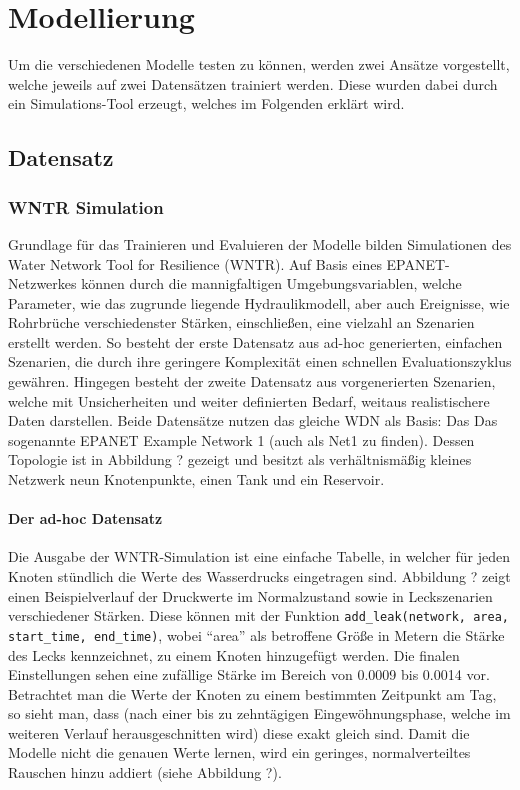 \chapter{Modellierung \label{Chapter-Methods}}

Um die verschiedenen Modelle testen zu können, werden zwei Ansätze vorgestellt, welche jeweils auf zwei Datensätzen
 trainiert werden. Diese wurden dabei durch ein Simulations-Tool erzeugt, welches im Folgenden erklärt wird.

\section{Datensatz}

\subsection*{WNTR Simulation}

Grundlage für das Trainieren und Evaluieren der Modelle bilden Simulationen des Water Network Tool for Resilience
 (WNTR). Auf Basis eines EPANET-Netzwerkes können durch die mannigfaltigen Umgebungsvariablen, welche Parameter,
 wie das zugrunde liegende Hydraulikmodell, aber auch Ereignisse, wie Rohrbrüche verschiedenster Stärken,
 einschließen, eine vielzahl an Szenarien erstellt werden. So besteht der erste Datensatz aus ad-hoc generierten, 
 einfachen Szenarien, die durch ihre geringere Komplexität einen schnellen Evaluationszyklus gewähren. Hingegen
 besteht der zweite Datensatz aus vorgenerierten Szenarien, welche mit Unsicherheiten und weiter definierten
 Bedarf, weitaus realistischere Daten darstellen. Beide Datensätze nutzen das gleiche WDN als Basis: Das Das
 sogenannte EPANET Example Network 1 (auch als Net1 zu finden). Dessen Topologie ist in Abbildung ? gezeigt
 und besitzt als verhältnismäßig kleines Netzwerk neun Knotenpunkte, einen Tank und ein Reservoir.

\subsubsection*{Der ad-hoc Datensatz}

Die Ausgabe der WNTR-Simulation ist eine einfache Tabelle, in welcher für jeden Knoten stündlich die Werte des
 Wasserdrucks eingetragen sind. Abbildung ? zeigt einen Beispielverlauf der Druckwerte im Normalzustand sowie
 in Leckszenarien verschiedener Stärken. Diese können mit der Funktion
 \texttt{add\_leak(network, area, start\_time, end\_time)}, wobei “area” als betroffene Größe in Metern die Stärke
 des Lecks kennzeichnet, zu einem Knoten hinzugefügt werden. Die finalen Einstellungen sehen eine zufällige Stärke
 im Bereich von 0.0009 bis 0.0014 vor. Betrachtet man die Werte der Knoten zu einem bestimmten Zeitpunkt am Tag,
 so sieht man, dass (nach einer bis zu zehntägigen Eingewöhnungsphase, welche im weiteren Verlauf herausgeschnitten
 wird) diese exakt gleich sind. Damit die Modelle nicht die genauen Werte lernen, wird ein geringes,
 normalverteiltes Rauschen hinzu addiert (siehe Abbildung ?).

